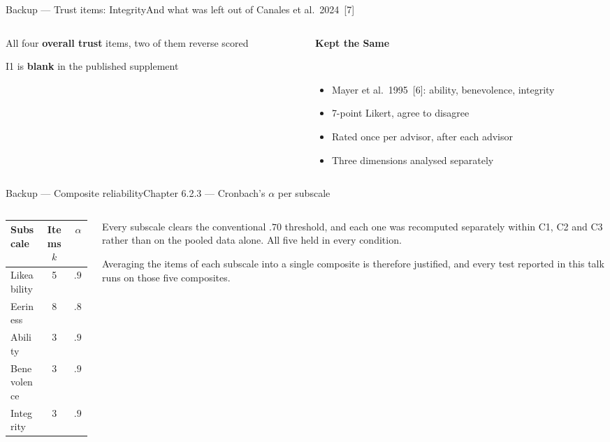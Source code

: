 \documentclass[aspectratio=169,10pt]{beamer}
\newcommand{\hl}[1]{{\color{knblue}\textbf{#1}}}
\newcommand{\bad}[1]{{\color{knred}\textbf{#1}}}
\newcommand{\panelhead}[1]{\noindent\colorbox{kncyan}{\parbox{0.96\textwidth}{\centering\vspace{1pt}\color{white}\scriptsize\bfseries #1\vspace{1pt}}}\\[0.25em]}
\newcommand{\panel}[1]{\noindent\colorbox{knlight}{\parbox{0.96\textwidth}{\vspace{2pt}\scriptsize
\begin{itemize}\setlength{\itemsep}{0.2em}\setlength{\leftmargini}{1.1em}#1\end{itemize}\vspace{2pt}}}}
\begin{document}
\begin{frame}{Backup — Trust items: Integrity}{And what was left out of Canales et al.\ 2024~[7]}
\begin{columns}[T,onlytextwidth]
\begin{column}{0.485\textwidth}
{        \item All four \hl{overall trust} items, two of them reverse scored
        \item I1 is \bad{blank} in the published supplement}
    \end{column}
    \begin{column}{0.485\textwidth}
      \panelhead{Kept the Same}
      \panel{%
        \item Mayer et al.\ 1995~[6]: ability, benevolence, integrity
        \item 7-point Likert, agree to disagree
        \item Rated once per advisor, after each advisor
        \item Three dimensions analysed separately}
    \end{column}
  \end{columns}
\end{frame}

\begin{frame}{Backup — Composite reliability}{Chapter 6.2.3 — Cronbach's $\alpha$ per subscale}
  \vspace{0.6em}
  \begin{columns}[T]
    \begin{column}{0.46\textwidth}
      \centering
      \begin{tabular}{@{}lcc@{}}
        \toprule
        \textbf{Subscale} & \textbf{Items $k$} & \textbf{$\alpha$} \\
        \midrule
        Likeability & 5 & $.94$ \\
        Eeriness    & 8 & $.87$ \\
        Ability     & 3 & $.96$ \\
        Benevolence & 3 & $.95$ \\
        Integrity   & 3 & $.92$ \\
        \bottomrule
      \end{tabular}
    \end{column}
    \begin{column}{0.50\textwidth}
      \small
      Every subscale clears the conventional $.70$ threshold, and each one was recomputed separately within C1, C2 and C3 rather than on the pooled data alone. All five held in every condition.
      \vspace{0.6em}

      Averaging the items of each subscale into a single composite is therefore justified, and every test reported in this talk runs on those five composites.
    \end{column}
  \end{columns}
\end{frame}
\end{document}

